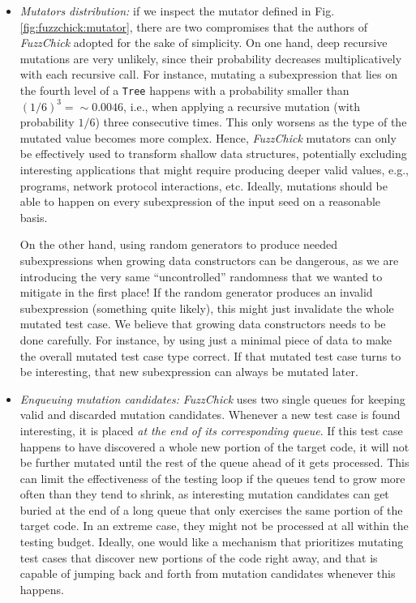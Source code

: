 \documentclass[acmsmall, anonymous]{acmart}
\newcommand{\fuzzchick}{\textit{FuzzChick}\xspace}
\begin{document}
\begin{itemize}
\item \emph{Mutators distribution:}
%
if we inspect the mutator defined in Fig. \ref{fig:fuzzchick:mutator}, there are
two compromises that the authors of \fuzzchick adopted for the sake of
simplicity.
%
On one hand, deep recursive mutations are very unlikely, since their probability
decreases multiplicatively with each recursive call.
%
For instance, mutating a subexpression that lies on the fourth level of a
\texttt{Tree} happens with a probability smaller than $(1/6)^3 = \sim 0.0046$,
i.e., when applying a recursive mutation (with probability $1/6$) three
consecutive times.
%
This only worsens as the type of the mutated value becomes more complex.
%
Hence, \fuzzchick mutators can only be effectively used to transform shallow
data structures, potentially excluding interesting applications that might
require producing deeper valid values, e.g., programs, network protocol
interactions, etc.
%
Ideally, mutations should be able to happen on every subexpression of the input
seed on a reasonable basis.

On the other hand, using random generators to produce needed subexpressions
when growing data constructors can be dangerous, as we are introducing the very
same ``uncontrolled'' randomness that we wanted to mitigate in the first place!
%
If the random generator produces an invalid subexpression (something quite
likely), this might just invalidate the whole mutated test case.
%
We believe that growing data constructors needs to be done carefully.
%
For instance, by using just a minimal piece of data to make the overall mutated
test case type correct.
%
If that mutated test case turns to be interesting, that new subexpression can
always be mutated later.

\item \emph{Enqueuing mutation candidates:}
%
\fuzzchick uses two single queues for keeping valid and discarded mutation
candidates.
%
Whenever a new test case is found interesting, it is placed \emph{at the end of
  its corresponding queue}.
%
If this test case happens to have discovered a whole new portion of the target
code, it will not be further mutated until the rest of the queue ahead of it
gets processed.
%
This can limit the effectiveness of the testing loop if the queues tend to grow
more often than they tend to shrink, as interesting mutation candidates can get
buried at the end of a long queue that only exercises the same portion of the
target code.
%
In an extreme case, they might not be processed at all within the testing
budget.
%
Ideally, one would like a mechanism that prioritizes mutating test cases that
discover new portions of the code right away, and that is capable of jumping
back and forth from mutation candidates whenever this happens.
%



\end{itemize}
\end{document}
